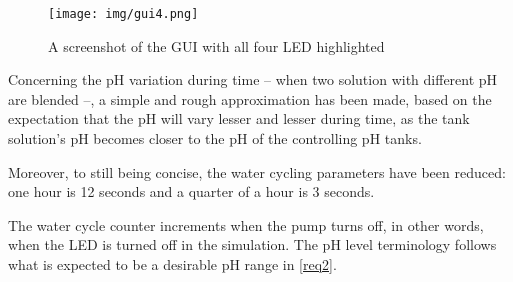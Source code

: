 \begin{figure}[h!]
    \centering
    \texttt{[image: img/gui4.png]}
    \caption{A screenshot of the GUI with all four LED highlighted}
    \label{fig:g4p}
\end{figure}

Concerning the pH variation during time -- when two solution with different pH are blended --,
a simple and rough approximation has been made, 
based on the expectation that the pH will vary lesser and lesser during time,
as the tank solution's pH becomes closer to the pH of the controlling pH tanks.

Moreover,
to still being concise,
the water cycling parameters have been reduced:
one hour is 12 seconds and a quarter of a hour is 3 seconds.

The water cycle counter increments when the pump turns off,
in other words,
when the LED is turned off in the simulation.
The pH level terminology follows what is expected to be a desirable pH range in \ref{req2}.
